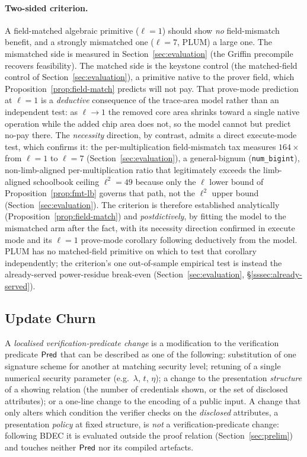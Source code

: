 \paragraph{Two-sided criterion.} A field-matched algebraic primitive ($\ell=1$) should show \emph{no} field-mismatch benefit, and a strongly mismatched one ($\ell=7$, PLUM) a large one. The mismatched side is measured in Section~\ref{sec:evaluation} (the Griffin precompile recovers feasibility). The matched side is the keystone control (the matched-field control of Section~\ref{sec:evaluation}), a primitive native to the prover field, which Proposition~\ref{prop:field-match} predicts will not pay. That prove-mode prediction at $\ell=1$ is a \emph{deductive} consequence of the trace-area model rather than an independent test: as $\ell\to1$ the removed core area shrinks toward a single native operation while the added chip area does not, so the model cannot but predict no-pay there. The \emph{necessity} direction, by contrast, admits a direct execute-mode test, which confirms it: the per-multiplication field-mismatch tax measures $164\times$ from $\ell=1$ to $\ell=7$ (Section~\ref{sec:evaluation}), a general-bignum (\texttt{num\_bigint}), non-limb-aligned per-multiplication ratio that legitimately exceeds the limb-aligned schoolbook ceiling $\ell^2=49$ because only the $\ell$ lower bound of Proposition~\ref{prop:fmt-lb} governs that path, not the $\ell^2$ upper bound (Section~\ref{sec:evaluation}). The criterion is therefore established analytically (Proposition~\ref{prop:field-match}) and \emph{postdictively}, by fitting the model to the mismatched arm after the fact, with its necessity direction confirmed in execute mode and its $\ell=1$ prove-mode corollary following deductively from the model. PLUM has no matched-field primitive on which to test that corollary independently; the criterion's one out-of-sample empirical test is instead the already-served power-residue break-even (Section~\ref{sec:evaluation}, \S\ref{sssec:already-served}).

\subsection{Update Churn}\label{ssec:update-churn}
\begin{definition}\label{def:lpc}
A \emph{localised verification-predicate change} is a modification to the verification predicate $\mathsf{Pred}$ that can be described as one of the following: substitution of one signature scheme for another at matching security level; retuning of a single numerical security parameter (e.g.\ $\lambda$, $t$, $\eta$); a change to the presentation \emph{structure} of a showing relation (the number of credentials shown, or the set of disclosed attributes); or a one-line change to the encoding of a public input. A change that only alters which condition the verifier checks on the \emph{disclosed} attributes, a presentation \emph{policy} at fixed structure, is \emph{not} a verification-predicate change: following BDEC it is evaluated outside the proof relation (Section~\ref{sec:prelim}) and touches neither $\mathsf{Pred}$ nor its compiled artefacts.
\end{definition}

